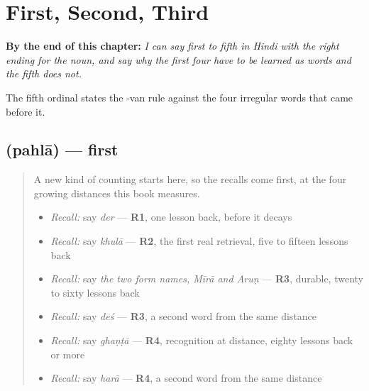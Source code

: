 
\chapter{First, Second, Third}
\label{ch:hi-ordinals}

\begin{chapteropening}
\textbf{By the end of this chapter:} \emph{I can say first to fifth in Hindi with the right ending for the noun, and say why the first four have to be learned as words and the fifth does not.}

The fifth ordinal states the -van rule against the four irregular words that came before it.
\end{chapteropening}

\section[\texorpdfstring{\hi{पहला} / \hi{पहली} / \hi{पहले} (pahlā / pahlī …)}{पहला / पहली / पहले (pahlā / pahlī …)}]{ (pahlā) — first}

\label{lesson:HI-C75-first}



\begin{quote}
A new kind of counting starts here, so the recalls come first, at the four growing distances this book measures.

\begin{itemize}
\raggedright
  \item \emph{Recall:} say \emph{der} — \textbf{R1}, one lesson back, before it decays
  \item \emph{Recall:} say \emph{khulā} — \textbf{R2}, the first real retrieval, five to fifteen lessons back
  \item \emph{Recall:} say \emph{the two form names, Mīrā and Aruṇ} — \textbf{R3}, durable, twenty to sixty lessons back
  \item \emph{Recall:} say \emph{deś} — \textbf{R3}, a second word from the same distance
  \item \emph{Recall:} say \emph{ghaṇṭā} — \textbf{R4}, recognition at distance, eighty lessons back or more
  \item \emph{Recall:} say \emph{harā} — \textbf{R4}, a second word from the same distance
\end{itemize}
\end{quote}

